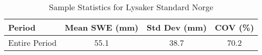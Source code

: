 
    \begin{table}[h!]
        \centering
        \caption{Sample Statistics for Lysaker Standard Norge}
        \begin{tabular}{lccc} 
            \toprule
            \textbf{Period} & \textbf{Mean SWE (mm)} & \textbf{Std Dev (mm)} & \textbf{COV (\%)} \\
            \midrule
            Entire Period & 55.1 & 38.7 & 70.2 \\
            \bottomrule
        \end{tabular}
        \label{tab:sample_stats_Lysaker Standard Norge}
    \end{table}
    